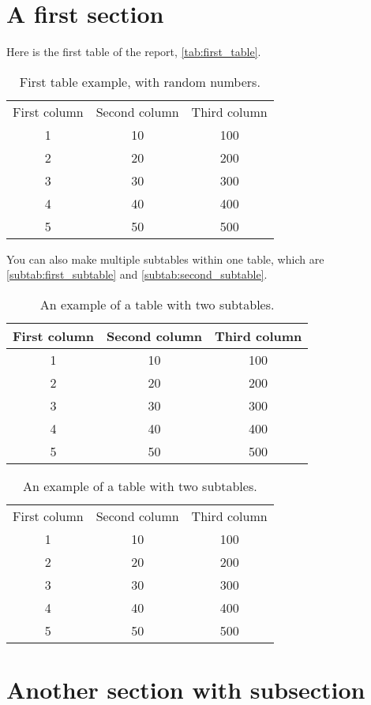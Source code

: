 \section{A first section}
Here is the first table of the report, \autoref{tab:first_table}. 
\begin{table}[h]
    \centering
    \begin{tabular}{ccc}
    First column & Second column & Third column \\
    1            & 10            & 100          \\
    2            & 20            & 200          \\
    3            & 30            & 300          \\
    4            & 40            & 400          \\
    5            & 50            & 500         
    \end{tabular}
    \caption{First table example, with random numbers.}
    \label{tab:first_table}
\end{table}
You can also make multiple subtables within one table, which are \autoref{subtab:first_subtable} and \autoref{subtab:second_subtable}.
\begin{table}[h]
    \centering
    \begin{subtable}{0.49\linewidth}
        \centering
        \begin{tabular}{|c|c|c|}
        \hline
        First column & Second column & Third column \\ \hline
        1            & 10            & 100          \\ \hline
        2            & 20            & 200          \\ \hline
        3            & 30            & 300          \\ \hline
        4            & 40            & 400          \\ \hline
        5            & 50            & 500          \\ \hline
        \end{tabular}
        \caption{First subtable, with borders.}
        \label{subtab:first_subtable}
    \end{subtable}
    \hfill
    \begin{subtable}{0.49\linewidth}
      \centering
      \begin{tabular}{ccc}
      First column & Second column & Third column \\
      1            & 10            & 100          \\
      2            & 20            & 200          \\
      3            & 30            & 300          \\
      4            & 40            & 400          \\
      5            & 50            & 500         
      \end{tabular}
      \caption{Second subtable, without borders.}
      \label{subtab:second_subtable}
    \end{subtable}
    \caption{An example of a table with two subtables.}
    \label{tab:second_table}
  \end{table}
\section{Another section with subsection}

